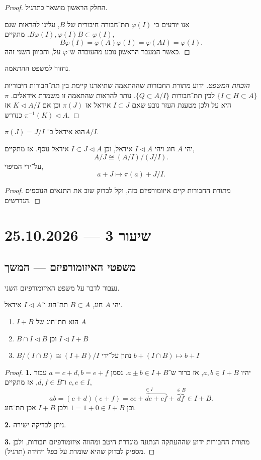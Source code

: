 \begin{proof}
	החלק הראשון מושאר כתרגיל.

	אנו יודעים כי $\varphi(I)$ תת־חבורה חיבורית של $B$, עלינו להראות שגם $B \varphi(I), \varphi(I) B \subset \varphi(I)$.
	מתקיים,
	\[
		B \varphi(I)
		= \varphi(A) \varphi(I)
		= \varphi(A I)
		= \varphi(I)
	.\]
	כאשר המעבר הראשון נובע מהעובדה ש־$\varphi$ על, והכיוון השני זהה.
\end{proof}
נחזור למשפט ההתאמה.
\begin{proof}[הוכחת המשפט]
	ידוע מתורת החבורות שההתאמה שתיארנו קיימת בין תת־חבורות חיבוריות $\{ I \subset H \subset A \}$ לבין תת־חבורות $\{ Q \subset A / I \}$.
	נותר להראות שהתאמה זו משמרת אידאלים.
	$\pi$ היא על ולכן מטענת העזר נובע שאם $I \subset J$ אידאל אז $\pi(J)$ וכן אם $K \triangleleft A / I$ אז $\pi^{-1}(K) \triangleleft A$ כנדרש.
\end{proof}
\begin{remark}
	$\pi(J) = J / I$ הוא אידאל ב־$A / I$.
\end{remark}
\begin{theorem}
	יהי $A$ חוג ויהי $I \triangleleft A$ אידאל, וכן $I \subset J \triangleleft A$ אידאל נוסף.
	אז מתקיים,
	\[
		A / J
		\cong (A / I) / (J / I)
	.\]
	על־ידי המיפוי,
	\[
		a + J
		\mapsto \pi(a) + J / I
	.\]
\end{theorem}
\begin{proof}
	מתורת החבורות קיים איזומורפיזם כזה, וקל לבדוק שוב את התנאים הנוספים הנדרשים.
\end{proof}

\section{שיעור 3 --- 25.10.2026}
\subsection{משפטי האיזומורפיזם --- המשך}
נעבור לדבר על משפט האיזומורפיזם השני.
\begin{theorem}
	יהי $A$ חוג, $B \subset A$ תת־חוג ו־$I \triangleleft A$ אידאל.
	\begin{enumerate}
		\item $I + B$ הוא תת־חוג של $A$
		\item $B \cap I \triangleleft B$ וכן $I \triangleleft I + B$
		\item $B / (I \cap B) \cong (I + B) / I$ נתון על־ידי $b + (I \cap B) \mapsto b + I$
	\end{enumerate}
\end{theorem}
\begin{proof}
	\textbf{1.}
	יהיו $a, b \in I + B$, אז ברור ש־$a \pm b \in I + B$.
	נסמן $a = c + d, b = e + f$ עבור $c, e \in I$ ו־$d, f \in B$, אז מתקיים,
	\[
		a b
		= (c + d)(e + f)
		= \overbrace{c e + d e + cf}^{\in I} + \overbrace{df}^{\in B}
		\in I + B
	.\]
	וכן $1 = 1 + 0 \in I + B$ ולכן $I + B$ אכן תת־חוג.

	\textbf{2.}
	ניתן לבדיקה ישירה.

	\textbf{3.}
	מתורת החבורות ידוע שההעתקה הנתונה מוגדרת היטב ומהווה איזומורפיזם חבורות, ולכן מספיק לבדוק שהיא שומרת על כפל ויחידה (תרגיל).
\end{proof}

